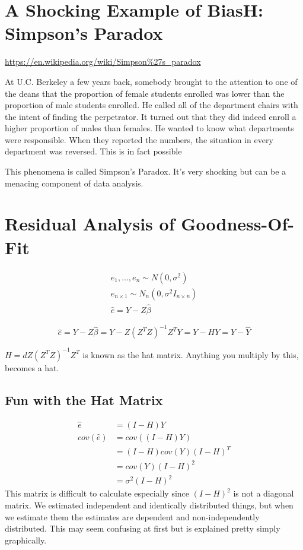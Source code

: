 \section{A Shocking Example of BiasH: Simpson's Paradox}

\url{https://en.wikipedia.org/wiki/Simpson\%27s\_paradox}

At U.C. Berkeley a few years back, somebody brought to the attention to one of the deans that the proportion of female students enrolled was lower than the proportion of male students enrolled. He called all of the department chairs with the intent of finding the perpetrator. It turned out that they did indeed enroll a higher proportion of males than females. He wanted to know what departments were responsible. When they reported the numbers, the situation in every department was reversed. This is in fact possible

This phenomena is called Simpson's Paradox. It's very shocking but can be a menacing component of data analysis.

\section{Residual Analysis of Goodness-Of-Fit}
\begin{align*}
    e_1,...,e_n \sim N(0,\sigma^2)\\
    e_{n\times 1}\sim N_n(0,\sigma^2I_{n\times n})\\
    \hat{e} = Y-Z\hat{\beta}
\end{align*}

\[\hat{e} = Y-Z\hat{\beta} = Y-Z(Z^TZ)^{-1}Z^TY = Y-HY=Y-\hat{Y}\]

$H=dZ(Z^TZ)^{-1}Z^T$ is known as the hat matrix. Anything you multiply by this, becomes a hat.

\subsection{Fun with the Hat Matrix}
\begin{align*}
    \hat{e}&=(I-H)Y \\
    cov(\hat{e}) &= cov((I-H)Y) \\
    &= (I-H)cov(Y)(I-H)^T \\
    &= cov(Y)(I-H)^2 \\
    &= \sigma^2(I-H)^2
\end{align*}
This matrix is difficult to calculate especially since $(I-H)^2$ is not a diagonal matrix. We estimated independent and identically distributed things, but when we estimate them the estimates are dependent and non-independently distributed. This may seem confusing at first but is explained pretty simply graphically.

